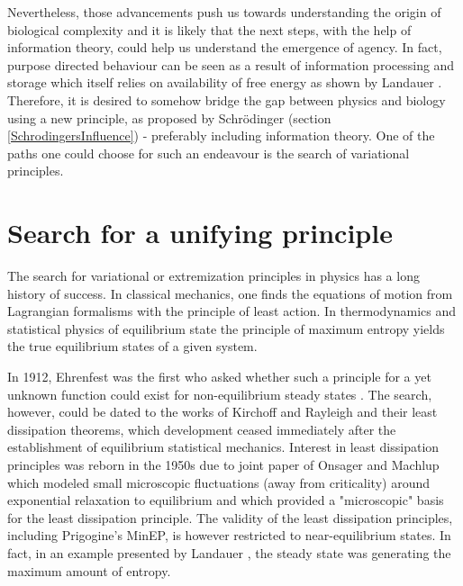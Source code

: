 \documentclass[a4paper,12pt]{article}
\begin{document}
Nevertheless, those advancements push us towards understanding the origin of biological complexity and it is likely that the next steps, with the help of information theory, could help us understand the emergence of agency. 
In fact, purpose directed behaviour can be seen as a result of information processing and storage which itself relies on availability of free energy as shown by Landauer \cite{Landauer:2002wc}. Therefore, it is desired to somehow bridge the gap between physics and biology using a new principle, as proposed by Schrödinger (section \ref{SchrodingersInfluence}) - preferably including information theory. One of the paths one could choose for such an endeavour is the search of variational principles.

\section{Search for a unifying principle}
\label{UnifyingPrinciple}
The search for variational or extremization principles in physics has a long history of success. In classical mechanics, one finds the equations of motion from Lagrangian formalisms with the principle of least action. In thermodynamics and statistical physics of equilibrium state the principle of maximum entropy yields the true equilibrium states of a given system. 

In 1912, Ehrenfest was the first who asked whether such a principle for a yet unknown function could exist for non-equilibrium steady states \cite{Dewar:2014ek}.
The search, however, could be dated to the works of Kirchoff and Rayleigh and their least dissipation theorems, which development ceased immediately after the establishment of equilibrium statistical mechanics.
Interest in least dissipation principles was reborn in the 1950s due to joint paper of Onsager and Machlup \cite{Onsager:3UFhYpWV} which modeled small microscopic fluctuations (away from criticality) around exponential relaxation to equilibrium and which provided a "microscopic" basis for the least dissipation principle. The validity of the least dissipation principles, including Prigogine's MinEP, is however restricted to near-equilibrium states. In fact, in an example presented by Landauer \cite{Landauer:pJ4RYJRG}, the steady state was generating the maximum amount of entropy.
\end{document}

